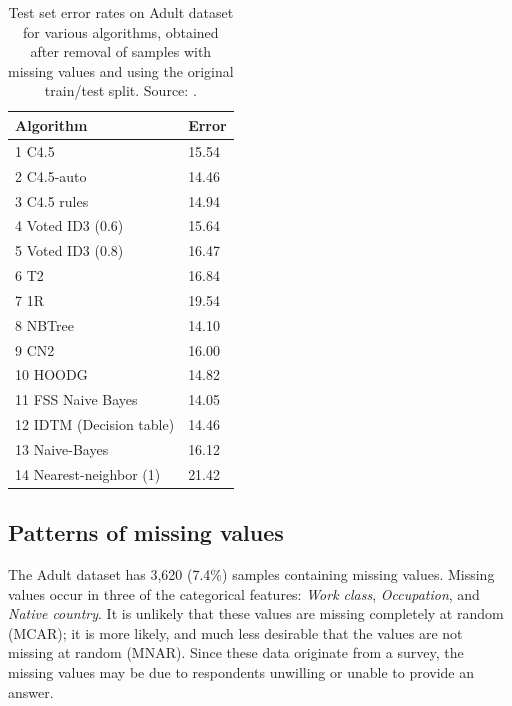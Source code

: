 \documentclass[10pt,twocolumn,letterpaper]{article}
\begin{document}
\begin{table}[htb]
\centering
\begin{tabular}{@{}ll@{}}
\toprule
\textbf{Algorithm}       & \textbf{Error} \\ \midrule
1  C4.5                  & 15.54          \\
2  C4.5-auto             & 14.46          \\
3  C4.5 rules            & 14.94          \\
4  Voted ID3 (0.6)       & 15.64          \\
5  Voted ID3 (0.8)       & 16.47          \\
6  T2                    & 16.84          \\
7  1R                    & 19.54          \\
8  NBTree                & 14.10          \\
9  CN2                   & 16.00          \\
10 HOODG                 & 14.82          \\
11 FSS Naive Bayes       & 14.05          \\
12 IDTM (Decision table) & 14.46          \\
13 Naive-Bayes           & 16.12          \\
14 Nearest-neighbor (1)  & 21.42          \\ \bottomrule
\end{tabular}
\caption{Test set error rates on Adult dataset for various algorithms, obtained after removal of samples with missing values and using the original train/test split. Source: \cite{Lichman2013}.}
\label{tab:benchmarks}
\end{table}

\subsection{Patterns of missing values}

The Adult dataset has 3,620 (7.4\%) samples containing missing values. Missing values occur in three of the categorical features: \textit{Work class}, \textit{Occupation}, and \textit{Native country}. It is unlikely that these values are missing completely at random (MCAR); it is more likely, and much less desirable that the values are not missing at random (MNAR). Since these data originate from a survey, the missing values may be due to respondents unwilling or unable to provide an answer.  \\
\end{document}
